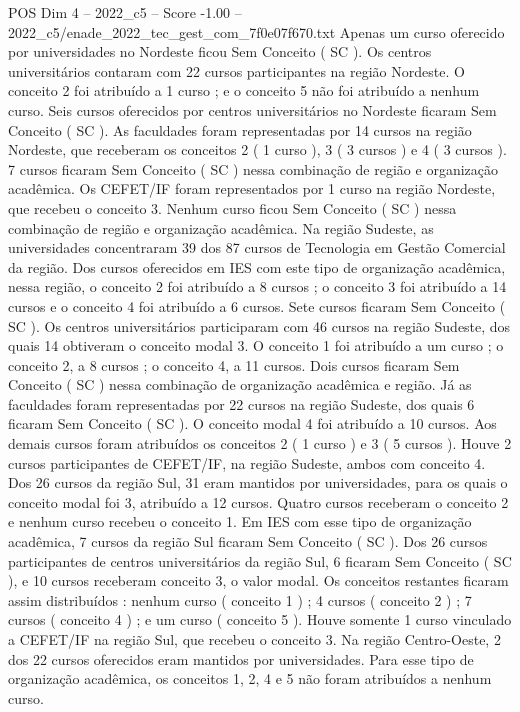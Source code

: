 \begin{textsample}{POS Dim 4 – 2022\_c5 – Score -1.00 – 2022\_c5/enade\_2022\_tec\_gest\_com\_7f0e07f670.txt}
Apenas um curso oferecido por universidades no Nordeste ficou Sem Conceito ( SC ).
Os centros universitários contaram com 22 cursos participantes na região Nordeste.
O conceito 2 foi atribuído a 1 curso ; e o conceito 5 não foi atribuído a nenhum curso.
Seis cursos oferecidos por centros universitários no Nordeste ficaram Sem Conceito ( SC ).
As faculdades foram representadas por 14 cursos na região Nordeste, que receberam os conceitos 2 ( 1 curso ), 3 ( 3 cursos ) e 4 ( 3 cursos ). 7 cursos ficaram Sem Conceito ( SC ) nessa combinação de região e organização acadêmica.
Os CEFET/IF foram representados por 1 curso na região Nordeste, que recebeu o conceito 3.
Nenhum curso ficou Sem Conceito ( SC ) nessa combinação de região e organização acadêmica.
Na região Sudeste, as universidades concentraram 39 dos 87 cursos de Tecnologia em Gestão Comercial da região.
Dos cursos oferecidos em IES com este tipo de organização acadêmica, nessa região, o conceito 2 foi atribuído a 8 cursos ; o conceito 3 foi atribuído a 14 cursos e o conceito 4 foi atribuído a 6 cursos.
Sete cursos ficaram Sem Conceito ( SC ).
Os centros universitários participaram com 46 cursos na região Sudeste, dos quais 14 obtiveram o conceito modal 3.
O conceito 1 foi atribuído a um curso ; o conceito 2, a 8 cursos ; o conceito 4, a 11 cursos.
Dois cursos ficaram Sem Conceito ( SC ) nessa combinação de organização acadêmica e região.
Já as faculdades foram representadas por 22 cursos na região Sudeste, dos quais 6 ficaram Sem Conceito ( SC ).
O conceito modal 4 foi atribuído a 10 cursos.
Aos demais cursos foram atribuídos os conceitos 2 ( 1 curso ) e 3 ( 5 cursos ).
Houve 2 cursos participantes de CEFET/IF, na região Sudeste, ambos com conceito 4.
Dos 26 cursos da região Sul, 31 eram mantidos por universidades, para os quais o conceito modal foi 3, atribuído a 12 cursos.
Quatro cursos receberam o conceito 2 e nenhum curso recebeu o conceito 1.
Em IES com esse tipo de organização acadêmica, 7 cursos da região Sul ficaram Sem Conceito ( SC ).
Dos 26 cursos participantes de centros universitários da região Sul, 6 ficaram Sem Conceito ( SC ), e 10 cursos receberam conceito 3, o valor modal.
Os conceitos restantes ficaram assim distribuídos : nenhum curso ( conceito 1 ) ; 4 cursos ( conceito 2 ) ; 7 cursos ( conceito 4 ) ; e um curso ( conceito 5 ).
Houve somente 1 curso vinculado a CEFET/IF na região Sul, que recebeu o conceito 3.
Na região Centro-Oeste, 2 dos 22 cursos oferecidos eram mantidos por universidades.
Para esse tipo de organização acadêmica, os conceitos 1, 2, 4 e 5 não foram atribuídos a nenhum curso.

\end{textsample}

